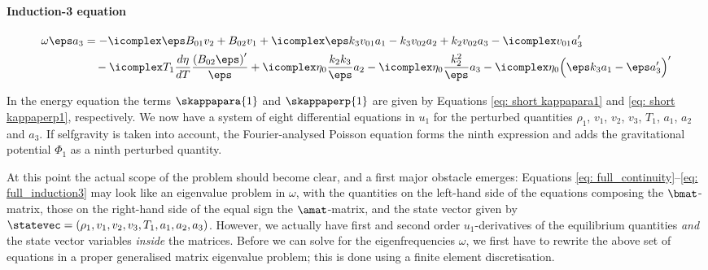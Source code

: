 \paragraph{Induction-3 equation}
{\customEquationFont
\begin{equation} \label{eq: full_induction3}
  \begin{aligned}
    \omega \eps a_3 &=
    - \icomplex \eps B_{01} v_2 + B_{02} v_1
    + \icomplex \eps k_3 v_{01} a_1
    - k_3 v_{02} a_2
    + k_2 v_{02} a_3
    - \icomplex v_{01} a_3' \\
    &\quad
    - \icomplex T_1 \frac{d\eta}{dT} \frac{\left(B_{02} \eps\right)'}{\eps}
    + \icomplex \eta_0 \frac{k_2 k_3}{\eps} a_2
    - \icomplex \eta_0 \frac{k_2^2}{\eps}a_3
    - \icomplex \eta_0 \Bigl(\eps k_3 a_1 - \eps a_3'\Bigr)'
  \end{aligned}
\end{equation}
}%

In the energy equation the terms $\skappapara{1}$ and $\skappaperp{1}$ are given by Equations \eqref{eq: short kappapara1} and \eqref{eq: short kappaperp1}, respectively. We now have a system of eight differential equations in $u_1$ for the perturbed quantities $\rho_1$, $v_1$, $v_2$, $v_3$, $T_1$, $a_1$, $a_2$ and $a_3$. If selfgravity is taken into account, the Fourier-analysed Poisson equation forms the ninth expression and adds the gravitational potential $\Phi_1$ as a ninth perturbed quantity.

At this point the actual scope of the problem should become clear, and a first major obstacle emerges: Equations \eqref{eq: full_continuity}--\eqref{eq: full_induction3} may look like an eigenvalue problem in $\omega$, with the quantities on the left-hand side of the equations composing the $\bmat$-matrix, those on the right-hand side of the equal sign the $\amat$-matrix, and the state vector given by $\statevec = (\rho_1, v_1, v_2, v_3, T_1, a_1, a_2, a_3)$. However, we actually have first and second order $u_1$-derivatives of the equilibrium quantities \emph{and} the state vector variables \emph{inside} the matrices.
Before we can solve for the eigenfrequencies $\omega$, we first have to rewrite the above set of equations in a proper generalised matrix eigenvalue problem; this is done using a finite element discretisation.


